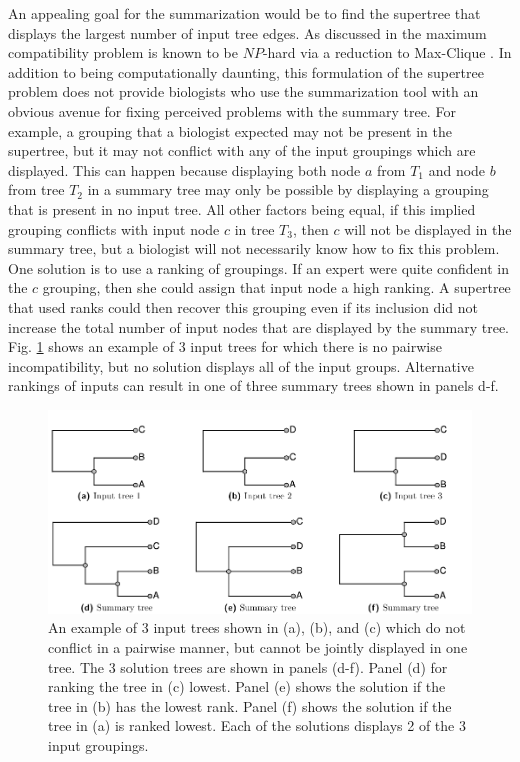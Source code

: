 \documentclass[fleqn,12pt,lineno,english]{wlpeerj}
\begin{document}
An appealing goal for the summarization would be to find the supertree
that displays the largest number of input tree edges. As discussed
in \citet[pages 92 and 131;][]{HusonRS2010} the maximum compatibility
problem is known to be $NP$-hard via a reduction to Max-Clique \citep{Karp1972}.
In addition to being computationally daunting, this formulation of
the supertree problem does not provide biologists who use the summarization
tool with an obvious avenue for fixing perceived problems with the
summary tree. For example, a grouping that a biologist expected may
not be present in the supertree, but it may not conflict with any
of the input groupings which are displayed. This can happen because
displaying both node $a$ from $T_{1}$ and node $b$ from tree $T_{2}$
in a summary tree may only be possible by displaying a grouping that
is present in no input tree. All other factors being equal, if this
implied grouping conflicts with input node $c$ in tree $T_{3}$,
then $c$ will not be displayed in the summary tree, but a biologist
will not necessarily know how to fix this problem. One solution is
to use a ranking of groupings. If an expert were quite confident in
the $c$ grouping, then she could assign that input node a high ranking.
A supertree that used ranks could then recover this grouping even
if its inclusion did not increase the total number of input nodes
that are displayed by the summary tree. Fig. \ref{fig:pairwisecompat}
shows an example of 3 input trees for which there is no pairwise incompatibility,
but no solution displays all of the input groups. Alternative rankings
of inputs can result in one of three summary trees shown in panels
d-f. 

\begin{figure}
\includegraphics[width=1.0\textwidth]{Fig2}

\caption{An example of 3 input trees shown in (a), (b), and (c) which do not
conflict in a pairwise manner, but cannot be jointly displayed in
one tree. The 3 solution trees are shown in panels (d-f). Panel (d)
for ranking the tree in (c) lowest. Panel (e) shows the solution if
the tree in (b) has the lowest rank. Panel (f) shows the solution
if the tree in (a) is ranked lowest. Each of the solutions displays
2 of the 3 input groupings. }

\label{fig:pairwisecompat}
\end{figure}
\end{document}
